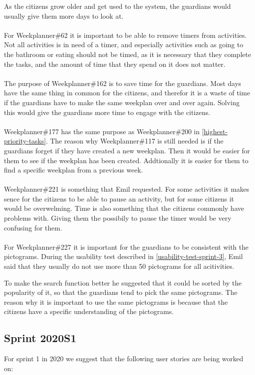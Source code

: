 As the citizens grow older and get used to the system, the guardians would usually give them more days to look at.
\\\\
For Weekplanner\#62 it is important to be able to remove timers from activities. 
Not all activities is in need of a timer, and especially activities such as going to the bathroom or eating should not be timed, as it is necessary that they complete the tasks, and the amount of time that they spend on it does not matter.
\\\\
The purpose of Weekplanner\#162 is to save time for the guardians. 
Most days have the same thing in common for the citizens, and therefor it is a waste of time if the guardians have to make the same weekplan over and over again.
Solving this would give the guardians more time to engage with the citizens.
\\\\
Weekplanner\#177 has the same purpose as Weekplanner\#200 in \autoref{highest-priority-tasks}. 
The reason why Weekplanner\#117 is still needed is if the guardians forget if they have created a new weekplan.
Then it would be easier for them to see if the weekplan has been created.
Addtionally it is easier for them to find a specific weekplan from a previous week.
\\\\
Weekplanner\#221 is something that Emil requested. 
For some activities it makes sence for the citizens to be able to pause an activity, but for some citizens it would be overwelming.
Time is also something that the citizens commonly have problems with. 
Giving them the possibily to pause the timer would be very confusing for them.
\\\\
For Weekplanner\#227 it is important for the guardians to be consistent with the pictograms.
During the usability test described in \autoref{usability-test-sprint-3}, Emil said that they usually do not use more than 50 pictograms for all acitivities.

To make the search function better he suggested that it could be sorted by the popularity of it, so that the guardians tend to pick the same pictograms.
The reason why it is important to use the same pictograms is because that the citizens have a specific understanding of the pictograms.

\subsection{Sprint 2020S1}
For sprint 1 in 2020 we suggest that the following user stories are being worked on:

